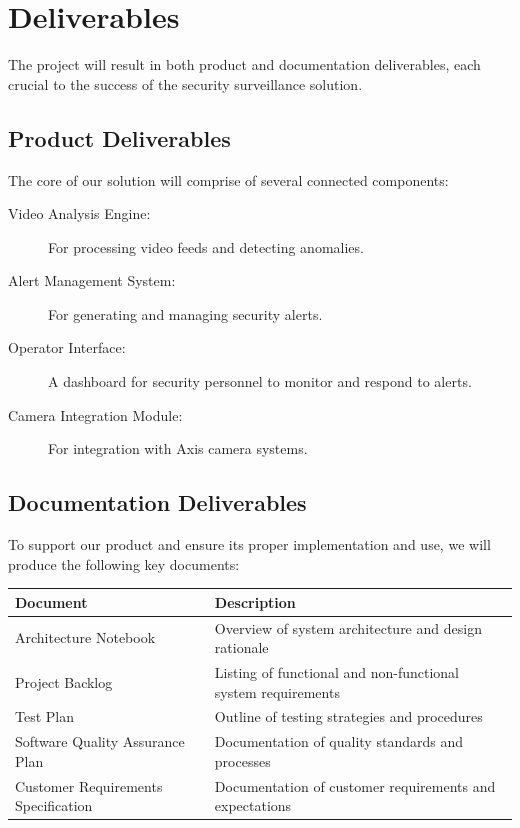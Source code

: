 \section{Deliverables}
The project will result in both product and documentation deliverables, each crucial to the success of the security surveillance solution.
    
\subsection{Product Deliverables}
    
The core of our solution will comprise of several connected components:
    
\begin{description}
    \item[Video Analysis Engine:] For processing video feeds and detecting anomalies.
    \item[Alert Management System:] For generating and managing security alerts.
    \item[Operator Interface:] A dashboard for security personnel to monitor and respond to alerts.
    \item[Camera Integration Module:] For integration with Axis camera systems.
\end{description}
    
    
\subsection{Documentation Deliverables}

To support our product and ensure its proper implementation and use, we will produce the following key documents:

\begin{center}
\begin{tabular}{|p{}|p{}|}
    \hline
    \textbf{Document} & \textbf{Description} \\
    \hline
    Architecture Notebook & Overview of system architecture and design rationale \\
    \hline
    Project Backlog & Listing of functional and non-functional system requirements \\
    \hline
    Test Plan & Outline of testing strategies and procedures \\
    \hline
    Software Quality Assurance Plan & Documentation of quality standards and processes \\
    \hline
    Customer Requirements Specification & Documentation of customer requirements and expectations \\
    \hline
\end{tabular}
\end{center}

